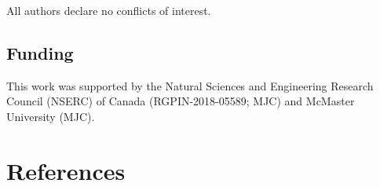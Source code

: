 \documentclass[
  doc, donotrepeattitle,floatsintext]{apa7}
\begin{document}
\noindent All authors declare no conflicts of interest.

\hypertarget{funding}{%
\subsection{Funding}\label{funding}}

\noindent This work was supported by the Natural Sciences and Engineering Research Council (NSERC) of Canada (RGPIN-2018-05589; MJC) and McMaster University (MJC).

\hypertarget{references}{%
\section{References}\label{references}}

\vspace{2ex}
\end{document}
